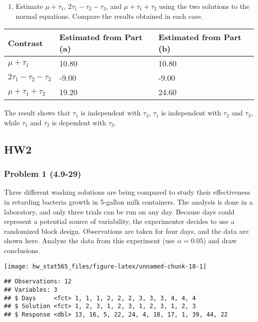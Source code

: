 \documentclass[]{article}
\providecommand{\tightlist}{%
  \setlength{\itemsep}{0pt}\setlength{\parskip}{0pt}}
\begin{document}
\begin{enumerate}
\def\labelenumi{(\alph{enumi})}
\setcounter{enumi}{2}
\tightlist
\item
  Estimate \(\mu+\tau_1\), \(2\tau_1-\tau_2-\tau_3\), and
  \(\mu+\tau_1+\tau_2\) using the two solutions to the normal equations.
  Compare the results obtained in each case.
\end{enumerate}

\begin{longtable}[]{@{}lll@{}}
\toprule
Contrast & Estimated from Part (a) & Estimated from Part
(b)\tabularnewline
\midrule
\endhead
\(\mu+\tau_1\) & 10.80 & 10.80\tabularnewline
\(2\tau_1-\tau_2-\tau_3\) & -9.00 & -9.00\tabularnewline
\(\mu+\tau_1+\tau_2\) & 19.20 & 24.60\tabularnewline
\bottomrule
\end{longtable}

The result shows that \(\tau_1\) is independent with \(\tau_3\),
\(\tau_1\) is independent with \(\tau_2\) and \(\tau_3\), while
\(\tau_1\) and \(\tau_2\) is dependent with \(\tau_3\).

\hypertarget{hw2}{%
\subsection{HW2}\label{hw2}}

\hypertarget{problem-1-4.9-29}{%
\subsubsection{Problem 1 (4.9-29)}\label{problem-1-4.9-29}}

Three different washing solutions are being compared to study their
effectiveness in retarding bacteria growth in 5-gallon milk containers.
The analysis is done in a laboratory, and only three trials can be run
on any day. Because days could represent a potential source of
variability, the experimenter decides to use a randomized block design.
Observations are taken for four days, and the data are shown here.
Analyze the data from this experiment (use \(\alpha = 0.05\)) and draw
conclusions.

\texttt{[image: hw\_stat565\_files/figure-latex/unnamed-chunk-18-1]}

\begin{verbatim}
## Observations: 12
## Variables: 3
## $ Days     <fct> 1, 1, 1, 2, 2, 2, 3, 3, 3, 4, 4, 4
## $ Solution <fct> 1, 2, 3, 1, 2, 3, 1, 2, 3, 1, 2, 3
## $ Response <dbl> 13, 16, 5, 22, 24, 4, 18, 17, 1, 39, 44, 22
\end{verbatim}
\end{document}
